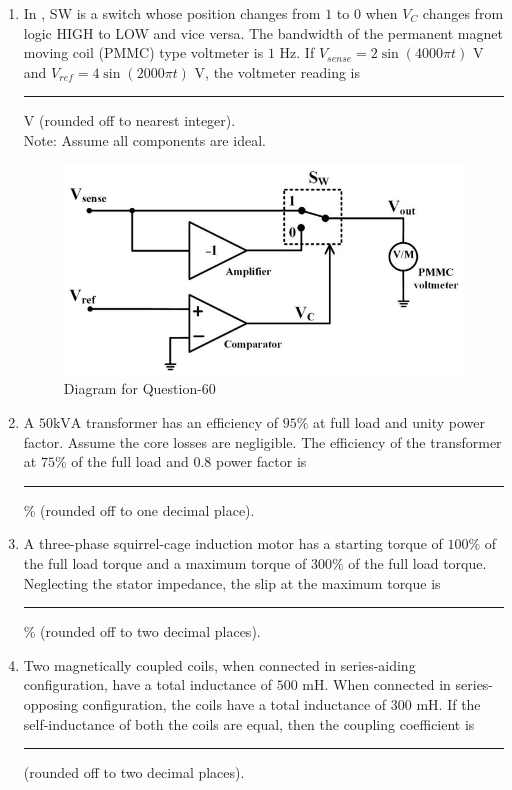 \documentclass[journal,12pt,onecolumn]{IEEEtran}
\theoremstyle{remark}
\begin{document}
\begin{enumerate}
\item In , SW is a switch whose position changes from $1$ to $0$ when $V_C$ changes from logic HIGH to LOW and vice versa. The bandwidth of the permanent magnet moving coil (PMMC) type voltmeter is $1$ Hz. If $V_{sense} = 2 \sin(4000 \pi t)$ V and $V_{ref} = 4 \sin(2000 \pi t)$ V, the voltmeter reading is \rule{1.5cm}{0.4pt} V (rounded off to nearest integer).\\
Note: Assume all components are ideal.
\par\hfill{}
\begin{figure}[H]
    \centering
    \includegraphics[width=0.4\columnwidth]{Figs/Q-60.png}
    \caption{Diagram for Question-60}
    \label{60}
\end{figure}

\item A $50\text{kVA}$ transformer has an efficiency of $95\%$ at full load and unity power factor. Assume the core losses are negligible. The efficiency of the transformer at $75\%$ of the full load and $0.8$ power factor is \rule{1.5cm}{0.4pt}\% (rounded off to one decimal place).
\par\hfill{}

\item A three-phase squirrel-cage induction motor has a starting torque of $100\%$ of the full load torque and a maximum torque of $300\%$ of the full load torque. Neglecting the stator impedance, the slip at the maximum torque is \rule{1.5cm}{0.4pt}\% (rounded off to two decimal places). \par\hfill{}

\item Two magnetically coupled coils, when connected in series-aiding configuration, have a total inductance of $500$ mH. When connected in series-opposing configuration, the coils have a total inductance of $300$ mH. If the self-inductance of both the coils are equal, then the coupling coefficient is \rule{1.5cm}{0.4pt} (rounded off to two decimal places).
\par\hfill{}


\end{enumerate}
\end{document}
